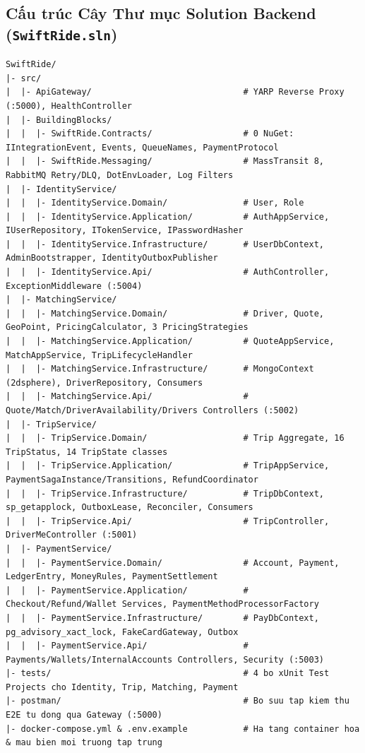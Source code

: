 \documentclass[12pt,a4paper]{article}
\begin{document}
\subsection{Cấu trúc Cây Thư mục Solution Backend (\texttt{SwiftRide.sln})}
\begin{lstlisting}[numbers=none, caption={To chuc cay thu muc Backend chuan Clean Architecture trong SwiftRide.sln}]
SwiftRide/
|- src/
|  |- ApiGateway/                              # YARP Reverse Proxy (:5000), HealthController
|  |- BuildingBlocks/
|  |  |- SwiftRide.Contracts/                  # 0 NuGet: IIntegrationEvent, Events, QueueNames, PaymentProtocol
|  |  |- SwiftRide.Messaging/                  # MassTransit 8, RabbitMQ Retry/DLQ, DotEnvLoader, Log Filters
|  |- IdentityService/
|  |  |- IdentityService.Domain/               # User, Role
|  |  |- IdentityService.Application/          # AuthAppService, IUserRepository, ITokenService, IPasswordHasher
|  |  |- IdentityService.Infrastructure/       # UserDbContext, AdminBootstrapper, IdentityOutboxPublisher
|  |  |- IdentityService.Api/                  # AuthController, ExceptionMiddleware (:5004)
|  |- MatchingService/
|  |  |- MatchingService.Domain/               # Driver, Quote, GeoPoint, PricingCalculator, 3 PricingStrategies
|  |  |- MatchingService.Application/          # QuoteAppService, MatchAppService, TripLifecycleHandler
|  |  |- MatchingService.Infrastructure/       # MongoContext (2dsphere), DriverRepository, Consumers
|  |  |- MatchingService.Api/                  # Quote/Match/DriverAvailability/Drivers Controllers (:5002)
|  |- TripService/
|  |  |- TripService.Domain/                   # Trip Aggregate, 16 TripStatus, 14 TripState classes
|  |  |- TripService.Application/              # TripAppService, PaymentSagaInstance/Transitions, RefundCoordinator
|  |  |- TripService.Infrastructure/           # TripDbContext, sp_getapplock, OutboxLease, Reconciler, Consumers
|  |  |- TripService.Api/                      # TripController, DriverMeController (:5001)
|  |- PaymentService/
|  |  |- PaymentService.Domain/                # Account, Payment, LedgerEntry, MoneyRules, PaymentSettlement
|  |  |- PaymentService.Application/           # Checkout/Refund/Wallet Services, PaymentMethodProcessorFactory
|  |  |- PaymentService.Infrastructure/        # PayDbContext, pg_advisory_xact_lock, FakeCardGateway, Outbox
|  |  |- PaymentService.Api/                   # Payments/Wallets/InternalAccounts Controllers, Security (:5003)
|- tests/                                      # 4 bo xUnit Test Projects cho Identity, Trip, Matching, Payment
|- postman/                                    # Bo suu tap kiem thu E2E tu dong qua Gateway (:5000)
|- docker-compose.yml & .env.example           # Ha tang container hoa & mau bien moi truong tap trung
\end{lstlisting}
\end{document}
